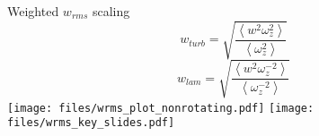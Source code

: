 \documentclass{beamer}
\begin{document}
\begin{comment}
\begin{frame}{Energy Spectrum}
    \centering
    \begin{figure}
        \small
        \bmp{0.235}
            \centering
            \subcaption{$1/Fr$ = 1}
        \emp
        \bmp{0.235}
            \centering
            \subcaption{$1/Fr$ = 3.16}
        \emp
        \bmp{0.235}
            \centering
            \subcaption{$1/Fr$ = 10}
        \emp
        \bmp{0.235}
            \centering
            \subcaption{$1/Fr$ = 17.32}
        \emp
        \normalsize
    \end{figure}
\end{frame}
\end{comment}


\begin{frame}{Weighted $w_{rms}$ scaling}
    \centering 
        {\small
        {\color{blue}
        \[
            w_{turb} =
            \sqrt{\frac{\left<w^2\omega_z^2\right>}{\left<\omega_z^2\right>}}
        \]
        }{\color{red}
        \[
            w_{lam} =
            \sqrt{\frac{\left<w^2\omega_z^{-2}\right>}{\left<\omega_z^{-2}\right>}}
        \]
        }}
    \emp
        \centering
        \texttt{[image: files/wrms\_plot\_nonrotating.pdf]}
        \texttt{[image: files/wrms\_key\_slides.pdf]}
    \emp
\end{frame}
\end{document}
